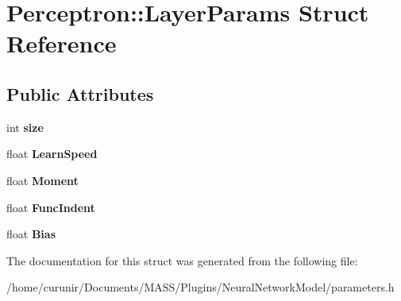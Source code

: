 \hypertarget{struct_perceptron_1_1_layer_params}{}\section{Perceptron\+:\+:Layer\+Params Struct Reference}
\label{struct_perceptron_1_1_layer_params}
\subsection*{Public Attributes}
\begin{DoxyCompactItemize}
\item 
int {\bfseries size}\hypertarget{struct_perceptron_1_1_layer_params_a2b7908df7e8e4f1b8d836d732fc29fde}{}\label{struct_perceptron_1_1_layer_params_a2b7908df7e8e4f1b8d836d732fc29fde}

\item 
float {\bfseries Learn\+Speed}\hypertarget{struct_perceptron_1_1_layer_params_aecb000611727cbf8ad2051118f2d8234}{}\label{struct_perceptron_1_1_layer_params_aecb000611727cbf8ad2051118f2d8234}

\item 
float {\bfseries Moment}\hypertarget{struct_perceptron_1_1_layer_params_a78bd006d129e016f1f710b9c07b2f985}{}\label{struct_perceptron_1_1_layer_params_a78bd006d129e016f1f710b9c07b2f985}

\item 
float {\bfseries Func\+Indent}\hypertarget{struct_perceptron_1_1_layer_params_a9c9b4e0e12a9705d99a3392873088d7d}{}\label{struct_perceptron_1_1_layer_params_a9c9b4e0e12a9705d99a3392873088d7d}

\item 
float {\bfseries Bias}\hypertarget{struct_perceptron_1_1_layer_params_a3ac7b22335513c6b707d99ac45ec95db}{}\label{struct_perceptron_1_1_layer_params_a3ac7b22335513c6b707d99ac45ec95db}

\end{DoxyCompactItemize}


The documentation for this struct was generated from the following file\+:\begin{DoxyCompactItemize}
\item 
/home/curunir/\+Documents/\+M\+A\+S\+S/\+Plugins/\+Neural\+Network\+Model/parameters.\+h\end{DoxyCompactItemize}
